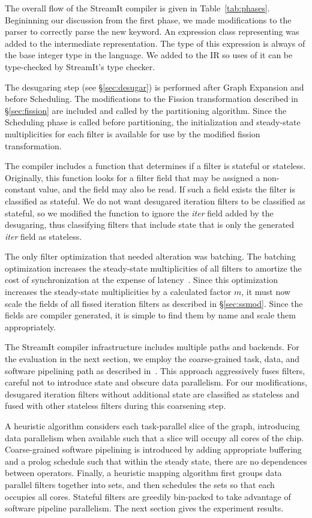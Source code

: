 The overall flow of the StreamIt compiler is given in
Table~\ref{tab:phases}.  Begininning our discussion from the first
phase, we made modifications to the parser to correctly parse the new
\iter keyword.  An expression class representing \iter was added to the
intermediate representation.  The type of this expression is always of
the base integer type in the language.  We added \iter to the IR so uses of
it can be type-checked by StreamIt's type checker.

The desugaring step (see \S\ref{sec:desugar}) is performed after Graph
Expansion and before Scheduling.  The modifications to the Fission
transformation described in \S\ref{sec:fission} are included and
called by the partitioning algorithm.  Since the Scheduling phase is
called before partitioning, the initialization and steady-state
multiplicities for each filter is available for use by the modified
fission transformation.

The compiler includes a function that determines if a filter is
stateful or stateless. Originally, this function looks for a filter
field that may be assigned a non-constant value, and the field may
also be read.  If such a field exists the filter is classified as stateful.  We
do not want desugared iteration filters to be classified as stateful,
so we modified the function to ignore the {\it iter} field added by
the desugaring, thus classifying filters that include state that is
only the generated {\it iter} field as stateless. 

The only filter optimization that needed alteration was batching.  The
batching optimization increases the steady-state multiplicities of all
filters to amortize the cost of synchronization at the expense of
latency~\cite{gordon-asplos06}.  Since this optimization increases the
steady-state multiplicities by a calculated factor $m$, it must now
scale the fields of all fissed iteration filters as described in
\S\ref{sec:ssmod}.  Since the fields are compiler generated, it is
simple to find them by name and scale them appropriately.

The StreamIt compiler infrastructure includes multiple paths and
backends.  For the evaluation in the next section, we employ the
coarse-grained task, data, and software pipelining path as described
in~\cite{gordon-asplos06}.  This approach aggressively fuses
filters, careful not to introduce state and obscure data
parallelism.  For our modifications, desugared iteration filters without
additional state are classified as stateless and fused with other stateless
filters during this coarsening step.  

A heuristic algorithm considers each task-parallel slice
of the graph, introducing data parallelism when available such that a
slice will occupy all cores of the chip.  Coarse-grained software
pipelining is introduced by adding appropriate buffering and a prolog
schedule such that within the steady state, there are no
dependences between operators.  Finally, a heuristic mapping algorithm
first groups data parallel filters together into sets, and then
schedules the sets so that each occupies all cores. Stateful filters
are greedily bin-packed to take advantage of software pipeline
parallelism.   The next section gives the experiment results.